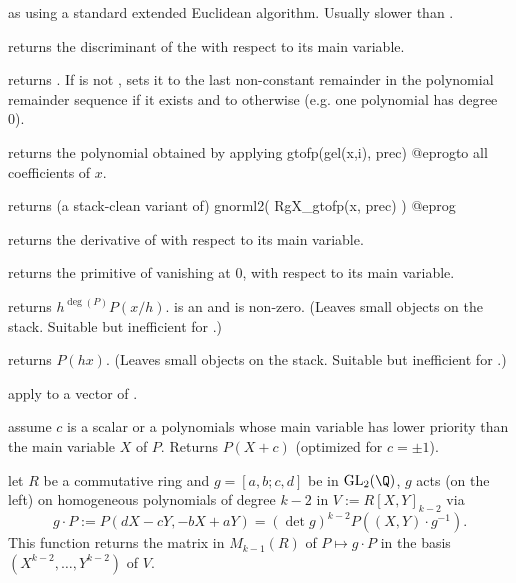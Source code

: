 as
 using a standard extended Euclidean algorithm. Usually
slower than .

 returns the discriminant of the  
with respect to its main variable.

 returns
. If  is not , sets it to the last
non-constant remainder in the polynomial remainder sequence if it exists and to
 otherwise (e.g. one polynomial has degree 0).


 returns the polynomial obtained by
applying
\bprog
  gtofp(gel(x,i), prec)
@eprog\noindent to all coefficients of $x$.

 returns (a stack-clean variant of)
\bprog
  gnorml2( RgX_gtofp(x, prec) )
@eprog

 returns the derivative of  with respect to
its main variable.

 returns the primitive of  vanishing at
$0$, with respect to its main variable.

 returns $h^{\deg(P)} P(x/h)$.
 is an  and  is non-zero. (Leaves small objects on the
stack. Suitable but inefficient for .)

 returns $P(h x)$. (Leaves small objects
on the stack. Suitable but inefficient for .)

 apply  to a vector
of .

 assume $c$ is a scalar or
a polynomials whose main variable has lower priority than the main variable
$X$ of $P$. Returns $P(X + c)$ (optimized for $c = \pm 1$).


 let $R$ be a commutative ring
and $g = [a,b;c,d]$ be in $\text{GL}_2(\Q)$, $g$ acts (on the left)
on homogeneous polynomials of degree $k-2$ in $V := R[X,Y]_{k-2}$ via
$$ g\cdot P := P(dX-cY, -bX+aY) = (\det g)^{k-2} P((X,Y)\cdot g^{-1}).$$
This function returns the matrix in $M_{k-1}(R)$ of $P\mapsto g\cdot P$ in
the basis $(X^{k-2},\dots,Y^{k-2})$ of $V$.

